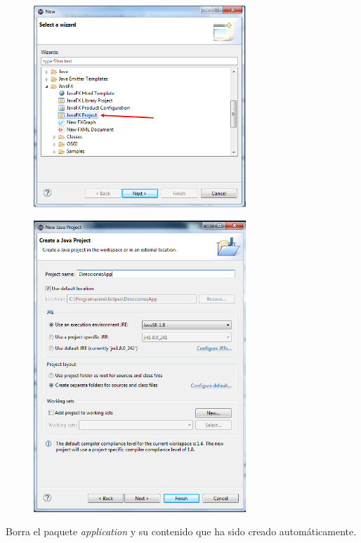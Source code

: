 	\begin{figure}[H]
		\includegraphics[width=8cm]{img/project1}
	\end{figure}
	\begin{figure}[H]
		\includegraphics[width=8cm]{img/project2}
	\end{figure}

Borra el paquete \textit{application} y su contenido que ha sido creado automáticamente.

